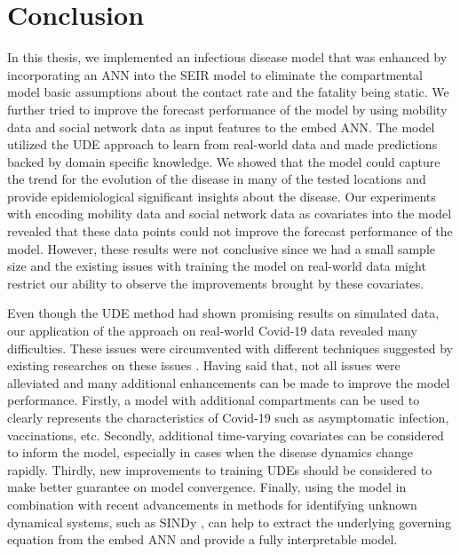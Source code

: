 \chapter{Conclusion}
\label{chap:conclusion}

In this thesis, we implemented an infectious disease model that was enhanced by incorporating an \gls{ANN} into the \gls{SEIR} model to eliminate the compartmental model basic assumptions about the contact rate and the fatality being static.
We further tried to improve the forecast performance of the model by using mobility data and social network data as input features to the embed \gls{ANN}.
The model utilized the \gls{UDE} approach \cite{rackauckasUniversalDifferentialEquations2020} to learn from real-world data and made predictions backed by domain specific knowledge.
We showed that the model could capture the trend for the evolution of the disease in many of the tested locations and provide epidemiological significant insights about the disease.
Our experiments with encoding mobility data and social network data as covariates into the model revealed that these data points could not improve the forecast performance of the model.
However, these results were not conclusive since we had a small sample size and the existing issues with training the model on real-world data might restrict our ability to observe the improvements brought by these covariates.

Even though the \gls{UDE} method had shown promising results on simulated data, our application of the approach on real-world Covid-19 data revealed many difficulties.
These issues were circumvented with different techniques suggested by existing researches on these issues \cite{kimStiffNeuralOrdinary2021,rackauckasUniversalDifferentialEquations2020}.
Having said that, not all issues were alleviated and many additional enhancements can be made to improve the model performance.
Firstly, a model with additional compartments can be used to clearly represents the characteristics of Covid-19 such as asymptomatic infection, vaccinations, etc.
Secondly, additional time-varying covariates can be considered to inform the model, especially in cases when the disease dynamics change rapidly.
Thirdly, new improvements to training \glspl{UDE} should be considered to make better guarantee on model convergence.
Finally, using the model in combination with recent advancements in methods for identifying unknown dynamical systems, such as \gls{SINDy} \cite{bruntonDiscoveringGoverningEquations2016}, can help to extract the underlying governing equation from the embed \gls{ANN} and provide a fully interpretable model.